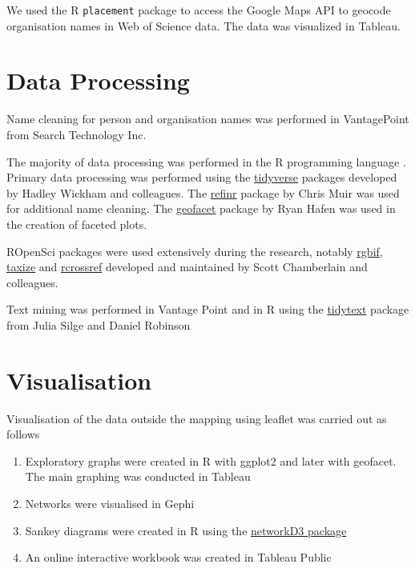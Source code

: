 \documentclass[]{book}
\theoremstyle{definition}
\theoremstyle{definition}
\theoremstyle{definition}
\theoremstyle{remark}
\begin{document}
We used the R \texttt{placement} package to access the Google Maps API
to geocode organisation names in Web of Science data. The data was
visualized in Tableau.

\hypertarget{data-processing}{%
\section{Data Processing}\label{data-processing}}

Name cleaning for person and organisation names was performed in
VantagePoint from Search Technology Inc.

The majority of data processing was performed in the R programming
language \citep{r_core}. Primary data processing was performed using the
\href{https://github.com/tidyverse/tidyverse}{tidyverse} packages
developed by Hadley Wickham and colleagues. The
\href{https://github.com/ChrisMuir/refinr}{refinr} package by Chris Muir
was used for additional name cleaning. The
\href{https://github.com/hafen/geofacet}{geofacet} package by Ryan Hafen
was used in the creation of faceted plots.

ROpenSci packages were used extensively during the research, notably
\href{https://github.com/ropensci/rgbif}{rgbif},
\href{https://github.com/ropensci/taxize}{taxize} and
\href{https://github.com/ropensci/rcrossref}{rcrossref} developed and
maintained by Scott Chamberlain and colleagues.

Text mining was performed in Vantage Point and in R using the
\href{https://github.com/juliasilge/tidytext}{tidytext} package from
Julia Silge and Daniel Robinson \citep{Fay_2018}

\hypertarget{visualisation}{%
\section{Visualisation}\label{visualisation}}

Visualisation of the data outside the mapping using leaflet was carried
out as follows

\begin{enumerate}
\def\labelenumi{\arabic{enumi}.}
\item
  Exploratory graphs were created in R with ggplot2 and later with
  geofacet. The main graphing was conducted in Tableau
\item
  Networks were visualised in Gephi
\item
  Sankey diagrams were created in R using the
  \href{https://christophergandrud.github.io/networkD3/}{networkD3
  package}
\item
  An online interactive workbook was created in Tableau Public
\end{enumerate}


\end{document}
